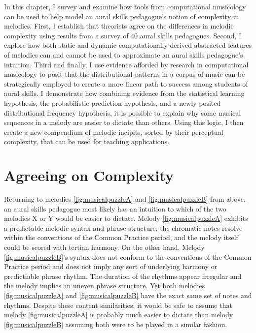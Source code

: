 \documentclass[12pt,]{book}
\begin{document}
In this chapter, I survey and examine how tools from computational musicology can be used to help model an aural skills pedagogue's notion of complexity in melodies.
First, I establish that theorists agree on the differences in melodic complexity using results from a survey of 40 aural skills pedagogues.
Second, I explore how both static and dynamic computationally derived abstracted features of melodies can and cannot be used to approximate an aural skills pedagogue's intuition.
Third and finally, I use evidence afforded by research in computational musicology to posit that the distributional patterns in a corpus of music can be strategically employed to create a more linear path to success among students of aural skills.
I demonstrate how combining evidence from the statistical learning hypothesis, the probabilistic prediction hypothesis, and a newly posited distributional frequency hypothesis, it is possible to explain why some musical sequences in a melody are easier to dictate than others.
Using this logic, I then create a new compendium of melodic incipits, sorted by their perceptual complexity, that can be used for teaching applications.

\hypertarget{agreeing-on-complexity}{%
\section{Agreeing on Complexity}\label{agreeing-on-complexity}}

Returning to melodies \ref{fig:musicalpuzzleA} and \ref{fig:musicalpuzzleB} from above, an aural skills pedagogue most likely has an intuition to which of the two melodies X or Y would be easier to dictate.
Melody \ref{fig:musicalpuzzleA} exhibits a predictable melodic syntax and phrase structure, the chromatic notes resolve within the conventions of the Common Practice period, and the melody itself could be scored with tertian harmony.
On the other hand, Melody \ref{fig:musicalpuzzleB}'s syntax does not conform to the conventions of the Common Practice period and does not imply any sort of underlying harmony or predictiable phrase rhythm.
The duration of the rhythms appear irregular and the melody implies an uneven phrase structure.
Yet both melodies \ref{fig:musicalpuzzleA} and \ref{fig:musicalpuzzleB} have the exact same set of notes and rhythms.
Despite these content similarities, it would be safe to assume that melody \ref{fig:musicalpuzzleA} is probably much easier to dictate than melody \ref{fig:musicalpuzzleB} assuming both were to be played in a similar fashion.
\end{document}
